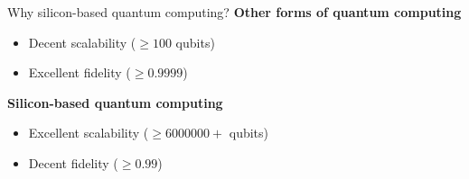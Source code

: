 \documentclass[../main.tex]{subfiles}
\begin{document}
\begin{frame}{Why silicon-based quantum computing?}
    \textbf{Other forms of quantum computing}
    \begin{itemize}
        \item Decent scalability (\(\geq 100\) qubits)
        \item Excellent fidelity (\(\geq 0.9999\))
    \end{itemize}

    \textbf{Silicon-based quantum computing}
    \begin{itemize}
        \item Excellent scalability (\(\geq 6000000+\) qubits)
        \item Decent fidelity (\(\geq 0.99\))
    \end{itemize}
\end{frame}
\end{document}
